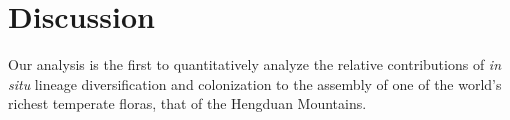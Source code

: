 \section{Discussion}

Our analysis is the first to quantitatively analyze the relative contributions of \textit{in situ} lineage diversification and colonization to the assembly of one of the world's richest temperate floras, that of the Hengduan Mountains. 